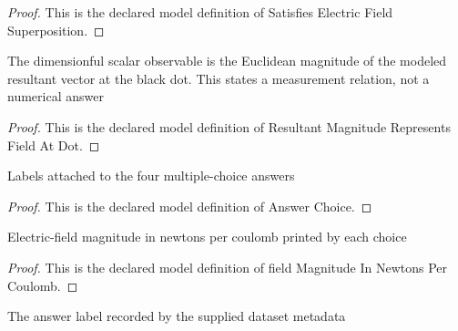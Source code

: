 \begin{proof}
  This is the declared model definition of Satisfies Electric Field Superposition.
\end{proof}
\begin{definition}
  \label{def:physics:phyx-mini-0834:phyxminiproblems-problemphyxmini0834-resultantmagnituderepresentsfieldatdot}
  The dimensionful scalar observable is the Euclidean magnitude of the modeled resultant vector at the black dot. This states a measurement relation, not a numerical answer
\end{definition}
\begin{proof}
  This is the declared model definition of Resultant Magnitude Represents Field At Dot.
\end{proof}
\begin{definition}
  \label{def:physics:phyx-mini-0834:phyxminiproblems-problemphyxmini0834-answerchoice}
  Labels attached to the four multiple-choice answers
\end{definition}
\begin{proof}
  This is the declared model definition of Answer Choice.
\end{proof}
\begin{definition}
  \label{def:physics:phyx-mini-0834:phyxminiproblems-problemphyxmini0834-answerchoice-fieldmagnitudeinnewtonspercoulomb}
  Electric-field magnitude in newtons per coulomb printed by each choice
\end{definition}
\begin{proof}
  This is the declared model definition of field Magnitude In Newtons Per Coulomb.
\end{proof}
\begin{definition}
  \label{def:physics:phyx-mini-0834:phyxminiproblems-problemphyxmini0834-recordeddatasetanswer}
  The answer label recorded by the supplied dataset metadata
\end{definition}
